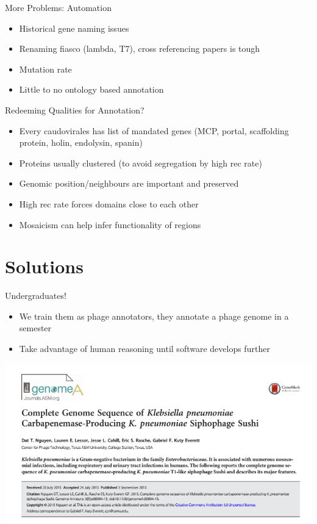 \documentclass[12pt]{beamer}
\begin{document}
\begin{frame}{More Problems: Automation}
    \begin{itemize}
        \item Historical gene naming issues
        \item Renaming fiasco (lambda, T7), cross referencing papers is tough
        \item Mutation rate
        \item Little to no ontology based annotation
    \end{itemize}
\end{frame}

\begin{frame}{Redeeming Qualities for Annotation?}
    \begin{itemize}
        \item Every caudovirales has list of mandated genes (MCP, portal, scaffolding protein, holin, endolysin, spanin)
        \item Proteins usually clustered (to avoid segregation by high rec rate)
        \item Genomic position/neighbours are important and preserved
        \item High rec rate forces domains close to each other
        \item Mosaicism can help infer functionality of regions
    \end{itemize}
\end{frame}

\section{Solutions}
\begin{frame}{Undergraduates!}
    \begin{itemize}
        \item We train them as phage annotators, they annotate a phage genome in a semester
        \item Take advantage of human reasoning until software develops further
    \end{itemize}
    \centering
    \includegraphics[height=0.5\textheight]{./genomea.png}
\end{frame}
\end{document}

